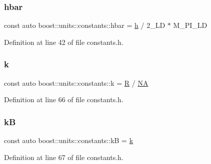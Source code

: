 \subsubsection{\texorpdfstring{hbar}{hbar}}
{\footnotesize\ttfamily const auto boost\+::units\+::constants\+::hbar = \hyperlink{namespaceboost_1_1units_1_1constants_a744f5a50efb6701fcbde9527affd7776}{h} / 2\+\_\+\+L\+D $\ast$ M\+\_\+\+P\+I\+\_\+\+LD}



Definition at line 42 of file constants.\+h.

\hypertarget{namespaceboost_1_1units_1_1constants_aaa1646309f48431cdde13c0c78b18b44}{}\label{namespaceboost_1_1units_1_1constants_aaa1646309f48431cdde13c0c78b18b44} 
\subsubsection{\texorpdfstring{k}{k}}
{\footnotesize\ttfamily const auto boost\+::units\+::constants\+::k = \hyperlink{namespaceboost_1_1units_1_1constants_a2d0c094390643c2ba3ac40a3ebdd9dd5}{R} / \hyperlink{namespaceboost_1_1units_1_1constants_a7f9d392dceaa7bbe31525aa275c6489d}{NA}}



Definition at line 66 of file constants.\+h.

\hypertarget{namespaceboost_1_1units_1_1constants_a3efaeb6808b8fbf551acf79d78c2557d}{}\label{namespaceboost_1_1units_1_1constants_a3efaeb6808b8fbf551acf79d78c2557d} 
\subsubsection{\texorpdfstring{kB}{kB}}
{\footnotesize\ttfamily const auto boost\+::units\+::constants\+::kB = \hyperlink{namespaceboost_1_1units_1_1constants_aaa1646309f48431cdde13c0c78b18b44}{k}}



Definition at line 67 of file constants.\+h.

\hypertarget{namespaceboost_1_1units_1_1constants_a2839705cdb6a3b2a7e9ab4c6967fab23}{}\label{namespaceboost_1_1units_1_1constants_a2839705cdb6a3b2a7e9ab4c6967fab23} 
